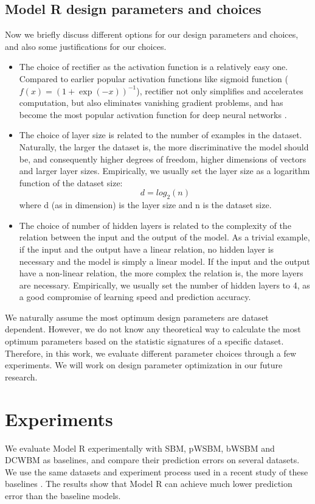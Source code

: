 \documentclass[11pt,twocolumn]{article}
\begin{document}
\subsection{Model R design parameters and choices}
Now we briefly discuss different options for our design parameters and choices,
and also some justifications for our choices.
\begin{itemize}
	\item The choice of rectifier as the activation function is a relatively easy one.
	Compared to earlier popular activation functions like sigmoid function
	($ f(x) = (1 + \exp(-x))^{-1} $),
	rectifier not only simplifies and accelerates computation,
	but also eliminates vanishing gradient problems,
	and has become the most popular activation function
	for deep neural networks \cite{lecun2015deep}.
	\item The choice of layer size is related to
	the number of examples in the dataset.
	Naturally, the larger the dataset is,
	the more discriminative the model should be,
	and consequently higher degrees of freedom,
	higher dimensions of vectors and larger layer sizes.
	Empirically, we usually set the layer size as a logarithm function of the dataset size:
	\[d = log_2(n)\]
	where d (as in dimension) is the layer size and n is the dataset size.
	\item The choice of number of hidden layers is related to the complexity of the relation between the input and the output of the model.
	As a trivial example, if the input and the output have a linear relation,
	no hidden layer is necessary and the model is simply a linear model.
	If the input and the output have a non-linear relation,
	the more complex the relation is, the more layers are necessary.
	Empirically, we usually set the number of hidden layers to 4,
	as a good compromise of learning speed and prediction accuracy.
\end{itemize}
We naturally assume the most optimum design parameters are dataset dependent.
However, we do not know any theoretical way to calculate the most optimum parameters based on the statistic signatures of a specific dataset.
Therefore, in this work, we evaluate different parameter choices through a few experiments.
We will work on design parameter optimization in our future research.

\section{Experiments} \label{section:experiments}
We evaluate Model R experimentally with SBM, pWSBM, bWSBM and DCWBM as baselines,
and compare their prediction errors on several datasets.
We use the same datasets and experiment process used in a recent study of these baselines \cite{aicher2014learning}.
The results show 
that Model R can achieve much lower prediction error than the baseline models.
\end{document}
